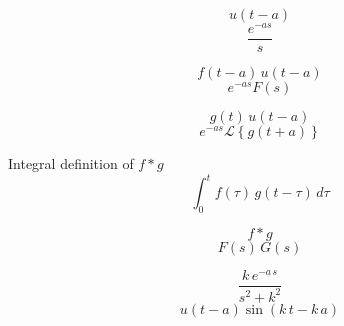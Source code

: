 \documentclass[grid, poker_landscape]{flashcards}
\begin{document}
  \begin{flashcard}{ \[ u(t - a) \] }
    \[
      \frac{e^{-as}}{s}
    \]
  \end{flashcard}

  \begin{flashcard}{ \[ f(t - a) \, u(t - a) \] }
    \[
      e^{-as} F(s)
    \]
  \end{flashcard}

  \begin{flashcard}{ \[ g(t) \, u(t - a) \] }
    \[
      e^{-as} \mathcal{L} \left \{ g(t + a) \right \}
    \]
  \end{flashcard}

  

  \begin{flashcard}{ Integral definition of $ f * g $ }
    \[
      \int_0^t f(\tau) \, g(t - \tau) \, d\tau
    \]
  \end{flashcard}

  \begin{flashcard}{ \[ f * g \] }
    \[
      F(s) \, G(s)
    \]
  \end{flashcard}






  \begin{flashcard}{ \[ \frac{ k\,e^{-a\,s} }{ s^2 + k^2} \] }
    \[
      u(t - a) \sin(k\,t - k\,a)
    \]
  \end{flashcard}
\end{document}
